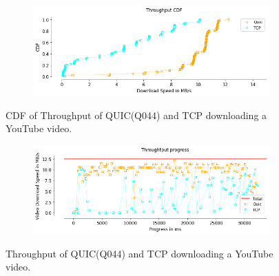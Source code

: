 \begin{frame}

\begin{figure}[!htb]
    \centering
    \begin{subfigure}{0.45\textwidth}
        \includegraphics[width=\linewidth]{./plots/youtube/throughput/ThroughputCDF.png}
    \end{subfigure}
    
    \caption{CDF of Throughput of QUIC(Q044) and TCP downloading a YouTube video.}
\end{figure}

\begin{figure}[!htb]
    
    \begin{subfigure}{0.45\textwidth}
        \includegraphics[width=\linewidth]{./plots/youtube/throughput/Throughtputprogress.png}
    \end{subfigure}
    
    \caption{Throughput of QUIC(Q044) and TCP downloading a YouTube video.}\label{fig:throughput-of-quic-q044-}
\end{figure}

\end{frame}
\clearpage

